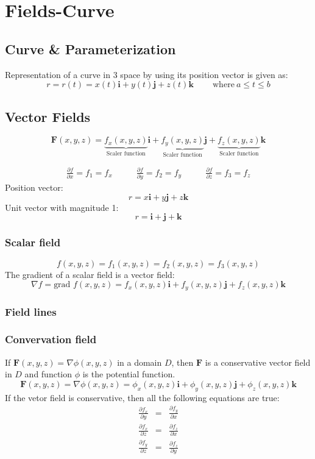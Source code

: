 \section{Fields-Curve}
\subsection{Curve \& Parameterization}
Representation of a curve in 3 space by using its position vector is given as:
$$r=r(t)=x(t)\mathbf{i}+y(t)\mathbf{j}+z(t)\mathbf{k}\qquad{\mathrm{~where~}}a\leq t\leq b$$

\subsection{Vector Fields}
$$\mathbf{F}(x,y,z)=\underbrace{ f_{x}(x,y,z) }_{ \text{Scaler function} }\mathbf{i}
+\underbrace{ f_{y}(x,y,z) }_{ \text{Scaler function} }\mathbf{j}
+\underbrace{ f_{z}(x,y,z) }_{ \text{Scaler function} }\mathbf{k}$$

\begin{eqnarray*}
    \frac{\partial f}{\partial x}=f_1=f_x\qquad
  &\frac{\partial f}{\partial y}=f_2=f_y\qquad
  &\frac{\partial f}{\partial z}=f_3=f_z
\end{eqnarray*}
Position vector:
$$r=x\mathbf{i}+y\mathbf{j}+z\mathbf{k}$$
Unit vector with magnitude 1:
$$r=\mathbf{i}+\mathbf{j}+\mathbf{k}$$
\subsubsection{Scalar field}
$$f(x,y,z)=f_1(x,y,z)=f_2(x,y,z)=f_3(x,y,z)$$
The gradient of a scalar field is a vector field:
$$\nabla f=\text{grad } f(x,y,z)=f_x(x,y,z)\mathbf{i}+f_y(x,y,z)\mathbf{j}+f_z(x,y,z)\mathbf{k}$$

\subsubsection{Field lines}

\subsubsection{Convervation field}
If $\mathbf{F}(x,y,z)=\nabla\phi(x,y,z)$ in a domain $D$, then $\mathbf{F}$ is a conservative vector field in $D$ and function $\phi$ is the potential function.
$$\mathbf{F}(x,y,z)=\nabla\phi(x,y,z)=\phi_x(x,y,z)\mathbf{i}+\phi_y(x,y,z)\mathbf{j}+\phi_z(x,y,z)\mathbf{k}$$
If the vetor field is conservative, then all the following equations are true:
\begin{eqnarray*}
  \frac{\partial f_x}{\partial y}&=&\frac{\partial f_y}{\partial x} \\
  \frac{\partial f_x}{\partial z}&=&\frac{\partial f_z}{\partial x} \\
  \frac{\partial f_y}{\partial z}&=&\frac{\partial f_z}{\partial y} \\
\end{eqnarray*}
